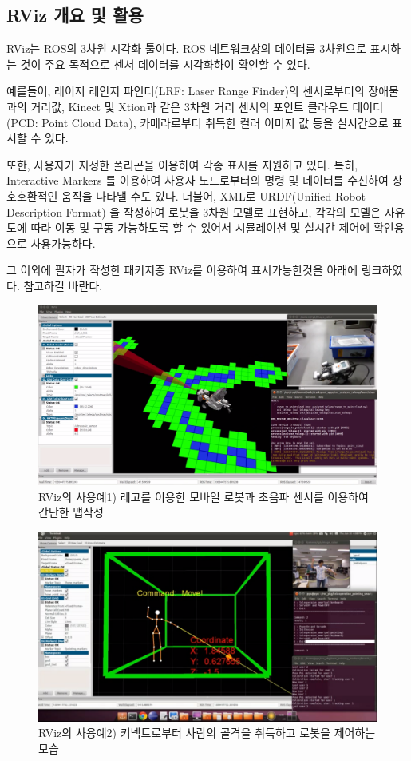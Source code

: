 \subsection{RViz 개요 및 활용}

RViz는 ROS의 3차원 시각화 툴이다. ROS 네트워크상의 데이터를 3차원으로 표시하는 것이 주요 목적으로 센서 데이터를 시각화하여 확인할 수 있다. 

예를들어, 레이저 레인지 파인더(LRF: Laser Range Finder)의 센서로부터의 장애물과의 거리값, Kinect 및 Xtion과 같은 3차원 거리 센서의 포인트 클라우드 데이터 (PCD: Point Cloud Data), 카메라로부터 취득한 컬러 이미지 값 등을 실시간으로 표시할 수 있다. 

또한, 사용자가 지정한 폴리곤을 이용하여 각종 표시를 지원하고 있다. 특히, Interactive Markers 를 이용하여 사용자 노드로부터의 명령 및 데이터를 수신하여 상호호환적인 움직을 나타낼 수도 있다. 더불어, XML로 URDF(Unified Robot Description Format) 을 작성하여 로봇을 3차원 모델로 표현하고, 각각의 모델은 자유도에 따라 이동 및 구동 가능하도록 할 수 있어서 시뮬레이션 및 실시간 제어에 확인용으로 사용가능하다.

그 이외에 필자가 작성한 패키지중 RViz를 이용하여 표시가능한것을 아래에 링크하였다. 참고하길 바란다.

\begin{figure}[h]
\centering\includegraphics[width=0.7\columnwidth]{pictures/chapter6/rviz_example1.png}
\caption{RViz의 사용예1) 레고를 이용한 모바일 로봇과 초음파 센서를 이용하여 간단한 맵작성}
\end{figure}

\begin{figure}[h]
\centering\includegraphics[width=0.7\columnwidth]{pictures/chapter6/rviz_example2.png}
\caption{RViz의 사용예2) 키넥트로부터 사람의 골격을 취득하고 로봇을 제어하는 모습}
\end{figure}

